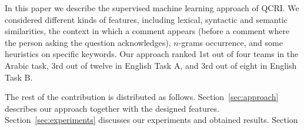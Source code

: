 In this paper we describe the supervised machine learning approach of QCRI. We 
considered different kinds of features, including lexical, syntactic and 
semantic similarities, the context in which a comment appears (\eg before a 
comment where the person asking the question acknowledges), $n$-grams 
occurrence, and some heuristics on specific keywords. Our approach ranked 1st 
out of four teams in the Arabic task, 3rd out of twelve in English Task A, and 
3rd out of eight in English Task B. 

The rest of the contribution is distributed as follows. 
Section~\ref{sec:approach} describes our approach together with the designed 
features. Section~\ref{sec:experiments} discusses our experiments and obtained 
results. Section \blue{\ldots}

